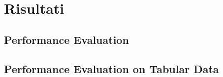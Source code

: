 \documentclass[../../Report.tex]{subfiles}
\begin{document}
\chapter{Risultati}
\section{Performance Evaluation}

\section{Performance Evaluation on Tabular Data}
\end{document}
